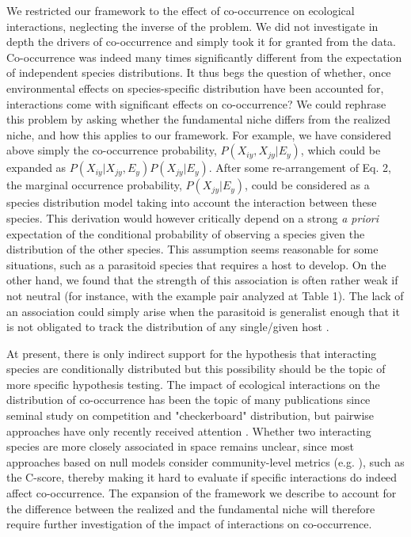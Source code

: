 \documentclass[12pt]{article}
\begin{document}
We restricted our framework to the effect of co-occurrence on ecological
interactions, neglecting the inverse of the problem. We did not investigate in
depth the drivers of co-occurrence and simply took it for granted from the
data. Co-occurrence was indeed many times significantly different from the
expectation of independent species distributions. It thus begs the question of
whether, once environmental effects on species-specific distribution have been
accounted for, interactions come with significant effects on co-occurrence? We
could rephrase this problem by asking whether the fundamental niche differs
from the realized niche, and how this applies to our framework. For example,
we have considered above simply the co-occurrence probability,
$P(X_{iy},X_{jy}|E_y)$, which could be expanded as $P(X_{iy}|X_{jy},E_y)
P(X_{jy}| E_y )$. After some re-arrangement of Eq. 2, the marginal occurrence
probability, $P(X_{jy}|E_y )$, could be considered as a species distribution
model taking into account the interaction between these species. This
derivation would however critically depend on a strong \emph{a priori} expectation of
the conditional probability of observing a species given the distribution of
the other species. This assumption seems reasonable for some situations, such
as a parasitoid species that requires a host to develop. On the other hand, we
found that the strength of this association is often rather weak if not
neutral (for instance, with the example pair analyzed at Table 1). The lack of
an association could simply arise when the parasitoid is generalist enough 
that it is not obligated to track the distribution of any single/given host
\citep{Cazelles2015}. 

At present, there is only indirect support for the hypothesis that interacting
species are conditionally distributed but this possibility  should be the
topic of more specific hypothesis testing. The impact of ecological
interactions on the distribution of co-occurrence has been the topic of many
publications since \citealt{Diamond1975} seminal study on competition and
"checkerboard" distribution, but pairwise approaches have only recently
received attention \citep{Veech2013}. Whether two interacting species are more
closely associated in space remains unclear, since most approaches based on
null models consider community-level metrics (e.g. \citealt{Gotelli2000}),
such as the C-score, thereby making it hard to evaluate if specific
interactions do indeed affect co-occurrence. The expansion of the framework we
describe to account for the difference between the realized and the
fundamental niche will therefore require further investigation of the impact
of interactions on co-occurrence.
\end{document}
